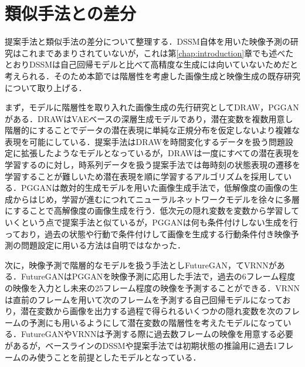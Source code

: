 \section{類似手法との差分}
提案手法と類似手法の差分について整理する．DSSM自体を用いた映像予測の研究はこれまであまりされていないが，これは第\ref{chap:introduction}章でも述べたとおりDSSMは自己回帰モデルと比べて高精度な生成には向いていないためだと考えられる．そのため本節では階層性を考慮した画像生成と映像生成の既存研究について取り上げる．

まず，モデルに階層性を取り入れた画像生成の先行研究としてDRAW\cite{gregor2015draw}，PGGAN\cite{karras2017progressive}がある．DRAWはVAEベースの深層生成モデルであり，潜在変数を複数用意し階層的にすることでデータの潜在表現に単純な正規分布を仮定しないより複雑な表現を可能にしている．提案手法はDRAWを時間変化するデータを扱う問題設定に拡張したようなモデルとなっているが，DRAWは一度にすべての潜在表現を学習するのに対し，時系列データを扱う提案手法では毎時刻の状態表現の遷移を学習することが難しいため潜在表現を順に学習するアルゴリズムを採用している．PGGANは敵対的生成モデルを用いた画像生成手法で，低解像度の画像の生成からはじめ，学習が進むにつれてニューラルネットワークモデルを徐々に多層にすることで高解像度の画像生成を行う．低次元の隠れ変数を変数から学習していくという点で提案手法と似ているが，PGGANは何も条件付けしない生成を行っており，過去の状態や行動で条件付けして画像を生成する行動条件付き映像予測の問題設定に用いる方法は自明ではなかった．

次に，映像予測で階層的なモデルを扱う手法としFutureGAN\cite{Aigner_2019}，てVRNN\cite{castrejon2019improved}がある．FutureGANはPGGANを映像予測に応用した手法で，過去の6フレーム程度の映像を入力とし未来の25フレーム程度の映像を予測することができる．VRNNは直前のフレームを用いて次のフレームを予測する自己回帰モデルになっており，潜在変数から画像を出力する過程で得られるいくつかの隠れ変数を次のフレームの予測にも用いるようにして潜在変数の階層性を考えたモデルになっている．FutureGANやVRNNは予測する際に過去数フレームの映像を用意する必要があるが，ベースラインのDSSMや提案手法では初期状態の推論用に過去1フレームのみ使うことを前提としたモデルとなっている．



